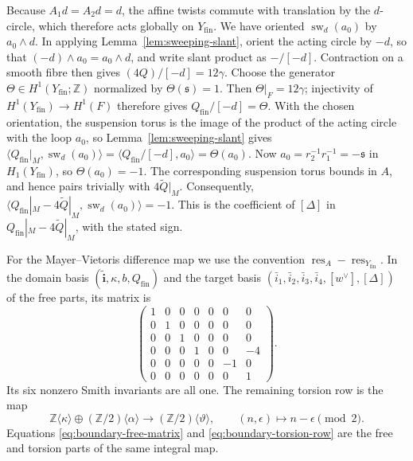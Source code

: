 Because $A_1d=A_2d=d$, the affine twists commute with translation by the
$d$-circle, which therefore acts globally
on $Y_{\mathrm{fin}}$.  We have oriented
$\operatorname{sw}_d(a_0)$ by $a_0\wedge d$.  In applying
Lemma~\ref{lem:sweeping-slant}, orient the acting circle by $-d$, so that
$(-d)\wedge a_0=a_0\wedge d$, and write slant product as
${-}/[-d]$.  Contraction on a smooth fibre then gives
$(4Q)/[-d]=12\gamma$.  Choose the generator
$\Theta\in H^1(Y_{\mathrm{fin}};\mathbb Z)$ normalized by
$\Theta(\mathfrak s)=1$.  Then $\Theta|_F=12\gamma$; injectivity of
$H^1(Y_{\mathrm{fin}})\to H^1(F)$ therefore gives
$Q_{\mathrm{fin}}/[-d]=\Theta$.  With the chosen orientation, the suspension torus
is the image of the product of the acting circle with the loop $a_0$, so
Lemma~\ref{lem:sweeping-slant} gives
$\langle Q_{\mathrm{fin}}|_M,\operatorname{sw}_{d}(a_0)\rangle
=\langle Q_{\mathrm{fin}}/[-d],a_0\rangle=\Theta(a_0)$.
Now $a_0=r_2^{-1}r_1^{-1}=-\mathfrak s$ in
$H_1(Y_{\mathrm{fin}})$, so $\Theta(a_0)=-1$.  The corresponding
suspension torus bounds in $A$, and hence pairs trivially with
$4\widetilde Q|_M$.  Consequently,
$\langle Q_{\mathrm{fin}}|_M-4\widetilde Q|_M,
\operatorname{sw}_{d}(a_0)\rangle=-1$.
This is the coefficient of $[\Delta]$ in
$Q_{\mathrm{fin}}|_M-4\widetilde Q|_M$, with the stated sign.

For the Mayer--Vietoris difference map we use the convention
$\operatorname{res}_A-\operatorname{res}_{Y_{\mathrm{fin}}}$.
In the domain basis
$(\widetilde{\mathbf i},\kappa,b,Q_{\mathrm{fin}})$ and the target basis
$(\bar i_1,\bar i_2,\bar i_3,\bar i_4,[w^\vee],[\Delta])$ of the free
parts, its matrix is
\begin{equation}\label{eq:boundary-free-matrix}
 \begin{pmatrix}
 1&0&0&0&0& 0& 0\\
 0&1&0&0&0& 0& 0\\
 0&0&1&0&0& 0& 0\\
 0&0&0&1&0& 0&-4\\
 0&0&0&0&0&-1& 0\\
 0&0&0&0&0& 0& 1
 \end{pmatrix}.
\end{equation}
Its six nonzero Smith invariants are all one.  The remaining torsion row is
the map
\begin{equation}\label{eq:boundary-torsion-row}
 \mathbb Z\langle\kappa\rangle\oplus
 (\mathbb Z/2)\langle\alpha\rangle
 \longrightarrow(\mathbb Z/2)\langle\vartheta\rangle,
 \qquad (n,\epsilon)\longmapsto n-\epsilon\pmod2.
\end{equation}
Equations \eqref{eq:boundary-free-matrix} and
\eqref{eq:boundary-torsion-row} are the free and torsion parts of the same
integral map.

